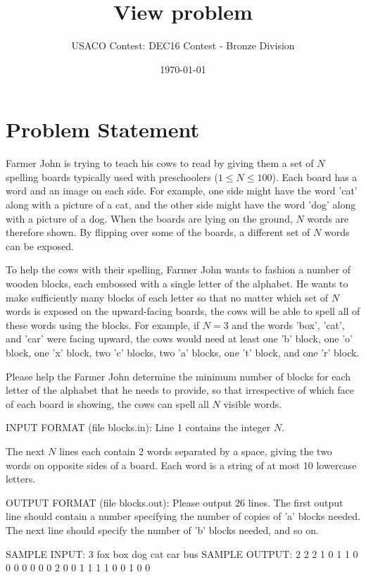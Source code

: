 \documentclass[12pt]{article}
\title{View problem}
\author{USACO Contest: DEC16 Contest - Bronze Division}
\date{\today}
\begin{document}
\maketitle

\section*{Problem Statement}

Farmer John is trying to teach his cows to read by giving them a set of $N$
spelling boards typically used with preschoolers ($1 \leq N \leq 100$). Each
board has a word and an image on each side.  For example, one side might have
the word 'cat' along with a picture of a cat, and the other side might have the
word 'dog' along with a picture of a dog.  When the boards are lying on the
ground, $N$ words are therefore shown.  By flipping over some of the boards, a
different set of $N$ words can be exposed.

To help the cows with their spelling, Farmer John wants to fashion a number of
wooden blocks, each embossed with a single letter of the alphabet. He wants to
make sufficiently many blocks of each letter so that no matter which set of $N$
words is exposed on the upward-facing boards, the cows will be able to spell all
of these words using the blocks.  For example, if $N=3$ and the words 'box',
'cat', and 'car' were facing upward, the cows would need at least one 'b' block,
one 'o' block, one 'x' block, two 'c' blocks, two 'a' blocks, one 't' block, and
one 'r' block.

Please help the Farmer John determine the minimum number of blocks for each
letter of the alphabet that he needs to provide, so that irrespective of which
face of each board is showing, the cows can spell all $N$ visible words.

INPUT FORMAT (file blocks.in):
Line 1 contains the integer $N$. 

The next $N$ lines each contain 2 words separated by a space, giving the two
words on opposite sides of a board.  Each word is a string of at most 10
lowercase letters.

OUTPUT FORMAT (file blocks.out):
Please output 26 lines. The first output line should contain a number specifying
the number of copies of 'a' blocks needed.  The next line should specify the
number of 'b' blocks needed, and so on.

SAMPLE INPUT:
3
fox box
dog cat
car bus
SAMPLE OUTPUT: 
2
2
2
1
0
1
1
0
0
0
0
0
0
0
2
0
0
1
1
1
1
0
0
1
0
0
\end{document}
